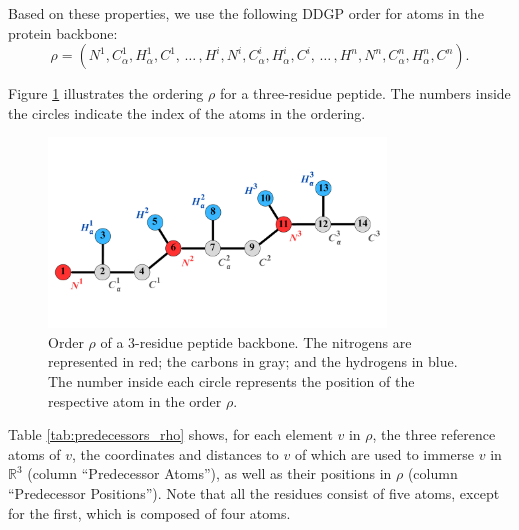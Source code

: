 \documentclass[journal=jacsat,manuscript=article]{achemso}
\begin{document}
Based on these properties, we use the following DDGP order for atoms in the protein backbone:
\begin{equation}\label{eq:ddgp_ordem_1}
    \rho = ( N^{1}, C_{\alpha}^{1}, H_{\alpha}^{1}, C^{1}, \, \dots \, , H^{i}, N^{i}, C_{\alpha}^{i}, H_{\alpha}^{i}, C^{i}, \, \dots \, , H^{n}, N^{n}, C_{\alpha}^{n}, H_{\alpha}^{n}, C^{n}).
\end{equation}

Figure \ref{fig:peptide_3_amino_with_rho} illustrates the ordering $\rho$ for a three-residue peptide. The numbers inside the circles indicate the index of the atoms in the ordering.

\begin{figure}[H]
        \includegraphics[width=0.8\textwidth]{Figures/peptideo3aminoacidos_comRho.pdf}
    \caption{\normalsize Order $\rho$ of a 3-residue peptide backbone. {The nitrogens are represented in red; the carbons in gray; and the hydrogens in blue. The number inside each circle represents the position of the respective atom in the order $\rho$.}}
    \label{fig:peptide_3_amino_with_rho}
\end{figure}

Table \ref{tab:predecessors_rho} shows, for each element $v$ in $\rho$, the three reference atoms of $v$, the coordinates and distances to $v$ of which are used to immerse $v$ in $\mathbb{R}^{3}$ (column ``Predecessor Atoms''), as well as their positions in $\rho$ (column ``Predecessor Positions''). Note that all the residues consist of five atoms, except for the first, which is composed of four atoms.
\end{document}
